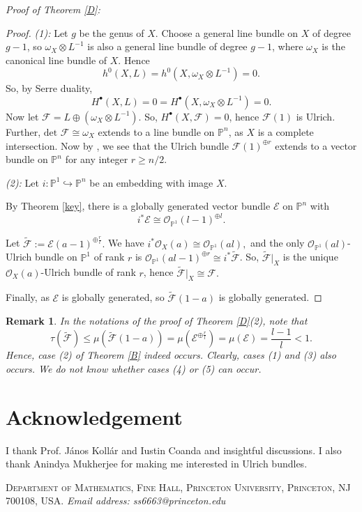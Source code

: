 \documentclass[11pt,letterpaper]{amsart}
\newtheorem{remark}[lemma]{Remark}
\begin{document}
\textit{Proof of Theorem \ref{D}:}
\begin{proof}
\textit{(1):} Let $g$ be the genus of $X$. Choose a general line bundle on $X$ of degree $g-1$, so $\omega_X\otimes L^{-1}$ is also a general line bundle of degree $g-1$, where $\omega_X$ is the canonical line bundle of $X$. Hence $$h^0(X,L)=h^0(X,\omega_X\otimes L^{-1})=0.$$ So, by Serre duality, $$H^\bullet(X,L)=0=H^\bullet(X,\omega_X\otimes L^{-1})=0.$$ Now let $\mathcal{F}=L\oplus(\omega_X\otimes L^{-1}).$ So, $H^\bullet(X,\mathcal{F})=0$, hence $\mathcal{F}(1)$ is Ulrich. Further, $\textrm{det }\mathcal{F}\cong \omega_X$ extends to a line bundle on $\mathbb{P}^n$, as $X$ is a complete intersection. Now by \cite{mathur2020extending}, we see that the Ulrich bundle $\mathcal{F}(1)^{\oplus r}$ extends to a vector bundle on $\mathbb{P}^n$ for any integer $r\geq n/2.$

\textit{(2):}
Let $i:\mathbb{P}^1\hookrightarrow \mathbb{P}^n$
be an embedding with image $X$.

By Theorem \ref{key}, there is a globally generated vector bundle
$\mathcal{E}$ on $\mathbb{P}^n$ with
\[
i^*\mathcal{E}\cong \mathcal{O}_{\mathbb{P}^1}(l-1)^{\oplus l}.
\]

Let $\widetilde{\mathcal{F}}:=\mathcal{E}(a-1)^{\oplus \frac rl}.$
We have $i^*\mathcal{O}_X(a)
\cong
\mathcal{O}_{\mathbb{P}^1}(al),$
and the only $\mathcal{O}_{\mathbb{P}^1}(al)$-Ulrich bundle on
$\mathbb{P}^1$ of rank $r$ is $\mathcal{O}_{\mathbb{P}^1}(al-1)^{\oplus r}\cong i^*\widetilde{\mathcal{F}}$. So, $\widetilde{\mathcal{F}}|_X$
is the unique $\mathcal{O}_X(a)$-Ulrich bundle of rank $r$,
hence $\widetilde{\mathcal{F}}|_X\cong \mathcal{F}.$

Finally, as $\mathcal{E}$ is globally generated, so $\widetilde{\mathcal{F}}(1-a)$
is globally generated. 
\end{proof}
\begin{remark}
    In the notations of the proof of Theorem \ref{D}(2), note that
\[
\tau(\widetilde{\mathcal{F}})
\le
\mu(\widetilde{\mathcal{F}}(1-a))
=
\mu(\mathcal{E}^{\oplus{\frac{r}{l}}})
=
\mu(\mathcal{E})
=
\frac{l-1}{l}
<1.
\]
Hence, case (2) of Theorem \ref{B} indeed occurs. Clearly, cases (1) and (3) also occurs. We do not know whether cases (4) or (5) can occur.
\end{remark}




\section{Acknowledgement}
 I thank Prof. János Kollár and Iustin Coanda and insightful discussions. I also thank Anindya Mukherjee for making me interested in Ulrich bundles.
\printbibliography
\begin{flushleft}
{\scshape Department of Mathematics, Fine Hall, Princeton University, Princeton, NJ 700108, USA}.
{\selectfont
\textit{Email address: ss6663@princeton.edu} }
\end{flushleft}
\end{document}
